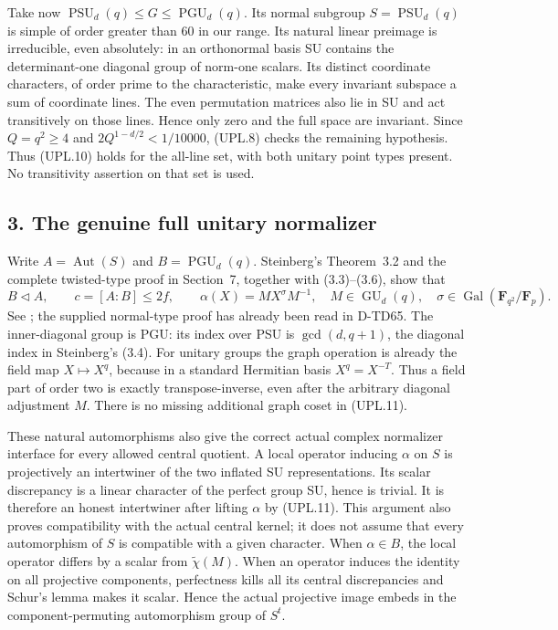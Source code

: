 Take now \(\operatorname{PSU}_d(q)\le G\le\operatorname{PGU}_d(q)\).
Its normal subgroup \(S=\operatorname{PSU}_d(q)\) is simple of order
greater than 60 in our range. Its natural linear preimage is
irreducible, even absolutely: in an orthonormal basis SU contains the
determinant-one diagonal group of norm-one scalars. Its distinct
coordinate characters, of order prime to the characteristic, make
every invariant subspace a sum of coordinate lines. The even
permutation matrices also lie in SU and act transitively on those
lines. Hence only zero and the full space are invariant.
Since \(Q=q^2\ge4\) and \(2Q^{1-d/2}<1/10000\), (UPL.8)
checks the remaining hypothesis. Thus (UPL.10) holds for the all-line
set, with both unitary point types present. No transitivity assertion
on that set is used.

\subsection*{3. The genuine full unitary normalizer}

Write \(A=\operatorname{Aut}(S)\) and
\(B=\operatorname{PGU}_d(q)\). Steinberg's Theorem~3.2 and the
complete twisted-type proof in Section~7, together with (3.3)--(3.6),
show that
\[
 B\triangleleft A,\qquad c=[A:B]\le2f,
 \qquad \alpha(X)=M X^\sigma M^{-1},
 \quad M\in\operatorname{GU}_d(q),\quad
 \sigma\in\operatorname{Gal}(\mathbf F_{q^2}/\mathbf F_p).
 \tag{UPL.11}
\]
See \cite[pp.~607--608 and 613--614]{PFL:Steinberg1960}; the
supplied normal-type proof has already been read in D-TD65.
The inner-diagonal group is PGU: its index over PSU is
\(\gcd(d,q+1)\), the diagonal index in Steinberg's (3.4).
For unitary groups the graph operation is already the field map
\(X\mapsto X^q\), because in a standard Hermitian basis
\(X^q=X^{-T}\). Thus a field part of order two is exactly
transpose-inverse, even after the arbitrary diagonal adjustment
\(M\). There is no missing additional graph coset in (UPL.11).

These natural automorphisms also give the correct actual complex
normalizer interface for every allowed central quotient. A local
operator inducing \(\alpha\) on \(S\) is projectively an intertwiner
of the two inflated SU representations. Its scalar discrepancy is
a linear character of the perfect group SU, hence is trivial.
It is therefore an honest intertwiner after lifting \(\alpha\) by
(UPL.11). This argument also proves compatibility with the actual
central kernel; it does not assume that every automorphism of \(S\)
is compatible with a given character. When \(\alpha\in B\), the
local operator differs by a scalar from \(\widetilde\chi(M)\).
When an operator induces the identity on all projective components,
perfectness kills all its central discrepancies and Schur's lemma
makes it scalar. Hence the actual projective image embeds in the
component-permuting automorphism group of \(S^t\).

